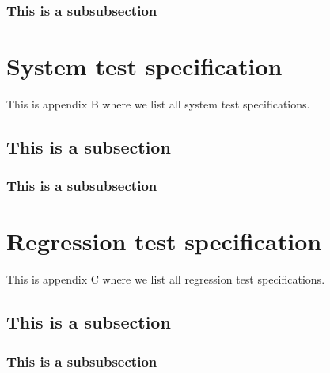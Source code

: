 \documentclass[a4paper]{article}
\begin{document}
\begin{appendices}
\subsubsection{This is a subsubsection}


\newpage

\section{System test specification} \label{appendix:section:systemtest}
This is appendix B where we list all system test specifications.

\subsection{This is a subsection}

\subsubsection{This is a subsubsection}


\newpage
\section{Regression test specification}
This is appendix C where we list all regression test specifications.

\subsection{This is a subsection}

\subsubsection{This is a subsubsection}
\end{appendices}
\end{document}
